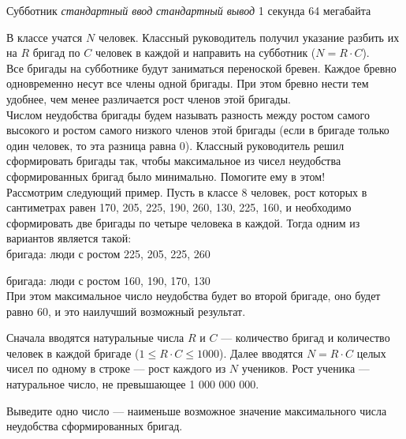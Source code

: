 \begin{problem}%
{Субботник}%
{\textsl{стандартный ввод}}%
{\textsl{стандартный вывод}}%
{1 секунда}%
{64 мегабайта}{}

В классе учатся $N$ человек. Классный руководитель получил указание разбить их на $R$ бригад по $C$ человек в каждой и направить на субботник ($N = R \cdot C$).\\

Все бригады на субботнике будут заниматься переноской бревен. Каждое бревно одновременно несут все члены одной бригады. При этом бревно нести тем удобнее, чем менее различается рост членов этой бригады.\\

Числом неудобства бригады будем называть разность между ростом самого высокого и ростом самого низкого членов этой бригады (если в бригаде только один человек, то эта разница равна 0). Классный руководитель решил сформировать бригады так, чтобы максимальное из чисел неудобства сформированных бригад было минимально. Помогите ему в этом!\\

Рассмотрим следующий пример. Пусть в классе 8 человек, рост которых в сантиметрах равен 170, 205, 225, 190, 260, 130, 225, 160, и необходимо сформировать две бригады по четыре человека в каждой. Тогда одним из вариантов является такой:\\

 бригада: люди с ростом 225, 205, 225, 260

 бригада: люди с ростом 160, 190, 170, 130\\

При этом максимальное число неудобства будет во второй бригаде, оно будет равно 60, и это наилучший возможный результат.

\InputFile

Сначала вводятся натуральные числа $R$ и $C$ — количество бригад и количество человек в каждой бригаде ($1 \le R \cdot C \le 1000$). Далее вводятся $N = R \cdot C$ целых чисел по одному в строке — рост каждого из $N$ учеников. Рост ученика — натуральное число, не превышающее 1 000 000 000.

\OutputFile

Выведите одно число — наименьше возможное значение максимального числа неудобства сформированных бригад.

\Examples

\begin{example}
%
\end{example}
\end{problem}